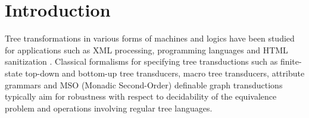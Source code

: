 
\section{Introduction}\label{sec:introduction-trees}

Tree transformations in various forms of machines and logics have been studied for applications such as XML processing, programming languages and HTML sanitization \cite{DVLM2015,Hosoya_2010,AK1998,MSV2000}. Classical formalisms for specifying tree transductions such as finite-state top-down and bottom-up tree transducers, macro tree transducers, attribute grammars and MSO (Monadic Second-Order) definable graph transductions typically aim for robustness with respect to decidability of the equivalence problem and operations involving regular tree languages.

